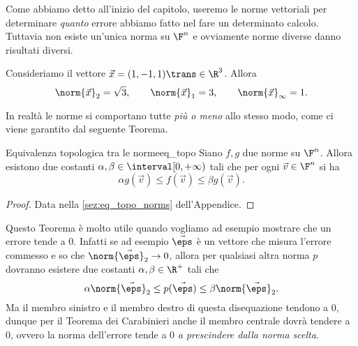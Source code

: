 Come abbiamo detto all'inizio del capitolo, useremo le norme vettoriali per determinare \emph{quanto} errore abbiamo fatto nel fare un determinato calcolo. Tuttavia non esiste un'unica norma su $\F^n$ e ovviamente norme diverse danno risultati diversi.

\begin{example}
    Consideriamo il vettore $\vec x = (1, -1, 1)\trans \in \R^3$. Allora \[
        \norm{\vec x}_2 = \sqrt 3, \qquad \norm{\vec x}_1 = 3, \qquad \norm{\vec x}_\infty = 1.
    \]
\end{example}

In realtà le norme si comportano tutte \emph{più o meno} allo stesso modo, come ci viene garantito dal seguente Teorema.
\begin{theorem}{Equivalenza topologica tra le norme}{eq_topo}
    Siano $f, g$ due norme su $\F^n$. Allora esistono due costanti $\alpha, \beta \in \interval[{0, +\infty})$ tali che per ogni $\vec v \in \F^n$ si ha  \[
        \alpha g(\vec v) \leq f(\vec v) \leq \beta g(\vec v).
    \]
\end{theorem}
\begin{proof}
    Data nella \autoref{sez:eq_topo_norms} dell'Appendice.
\end{proof}

Questo Teorema è molto utile quando vogliamo ad esempio mostrare che un errore tende a $0$. Infatti se ad esempio $\vec \eps$ è un vettore che misura l'errore commesso e so che $\norm{\vec \eps}_2 \to 0$, allora per qualsiasi altra norma $p$ dovranno esistere due costanti $\alpha, \beta \in \R^+$ tali che \[
    \alpha\norm{\vec \eps}_2 \leq p(\vec \eps) \leq \beta\norm{\vec \eps}_2.
\] Ma il membro sinistro e il membro destro di questa disequazione tendono a $0$, dunque per il Teorema dei Carabinieri anche il membro centrale dovrà tendere a $0$, ovvero la norma dell'errore tende a $0$ \emph{a prescindere dalla norma scelta}.
